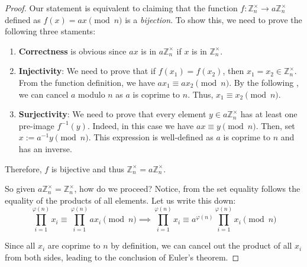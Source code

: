 \documentclass[../../book.tex]{subfiles}
\begin{document}
\begin{proof}
Our statement is equivalent to claiming that the 
function $f: \mathbb{Z}_n^{\times} \to a\mathbb{Z}_n^{\times}$ defined 
as $f(x) = ax \pmod{n}$ is a \emph{bijection}. To show this, we need to prove the following 
three staments:
\begin{enumerate}
    \item \textbf{Correctness} is obvious since $ax$ is in $a\mathbb{Z}_n^{\times}$ if $x$ is in $\mathbb{Z}_n^{\times}$.
    \item \textbf{Injectivity}: We need to prove that if $f(x_1)=f(x_2)$, 
    then $x_1=x_2 \in \mathbb{Z}_n^{\times}$. 
    From the function definition, we have $ax_1 \equiv ax_2 \pmod{n}$. By the following 
    , we can cancel $a$ modulo $n$ as $a$ is coprime to $n$. 
    Thus, $x_1 \equiv x_2 \pmod{n}$.
    \item \textbf{Surjectivity}: We need to prove that every element $y \in a\mathbb{Z}_n^{\times}$ has at least 
    one pre-image $f^{-1}(y)$. Indeed, in this case we have $ax \equiv y \pmod{n}$. Then, set $x := a^{-1}y \pmod {n}$. This 
    expression is well-defined as $a$ is coprime to $n$ and has an inverse.
\end{enumerate}

Therefore, $f$ is bijective and thus $\mathbb{Z}_n^{\times} = a\mathbb{Z}_n^{\times}$.

So given $a\mathbb{Z}_n^{\times} = \mathbb{Z}_n^{\times}$, how do we proceed? Notice, from the 
set equality follows the equality of the products of all elements. Let us write this down:
\begin{equation*}
    \prod_{i = 1}^{\varphi(n)} x_i \equiv \prod_{i = 1}^{\varphi(n)} a x_i \pmod{n} \implies \prod_{i = 1}^{\varphi(n)} x_i \equiv a^{\varphi(n)} \prod_{i = 1}^{\varphi(n)} x_i \pmod{n}
\end{equation*}
    
Since all $x_i$ are coprime to $n$ by definition, we can cancel out the product
of all $x_i$ from both sides, leading to the conclusion of Euler's theorem.
\end{proof}
\end{document}
